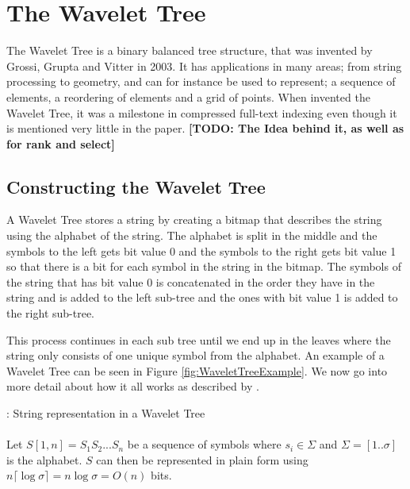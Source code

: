 \section{The Wavelet Tree}
The Wavelet Tree is a binary balanced tree structure, that was invented by Grossi, Grupta and Vitter \citep{Grossi:2003:HET:644108.644250} in 2003. 
It has applications in many areas; from string processing to geometry, and can for instance be used to represent; a sequence of elements, a reordering of elements and a grid of points. 
When \citep{Grossi:2003:HET:644108.644250} invented the Wavelet Tree, it was a milestone in compressed full-text indexing even though it is mentioned very little in the paper.
\textbf{[TODO: The Idea behind it, as well as for rank and select]}

\subsection{Constructing the Wavelet Tree}
A Wavelet Tree stores a string by creating a bitmap that describes the string using the alphabet of the string. The alphabet is split in the middle and the symbols to the left gets bit value 0 and the symbols to the right gets bit value 1 so that there is a bit for each symbol in the string in the bitmap. 
The symbols of the string that has bit value 0 is concatenated in the order they have in the string and is added to the left sub-tree and the ones with bit value 1 is added to the right sub-tree. 

This process continues in each sub tree until we end up in the leaves where the string only consists of one unique symbol from the alphabet. 
An example of a Wavelet Tree can be seen in Figure \ref{fig:WaveletTreeExample}. 
We now go into more detail about how it all works as described by \citep{Navjda13}.

\vspace{0.5 cm}
\begin{mdframed}[nobreak, linecolor=lightgray, linewidth=2pt]
\begin{definition}: String representation in a Wavelet Tree\\\\
Let $S[1,n] = S_1 S_2 ... S_n$ be a sequence of symbols where $s_i \in \Sigma$ and $\Sigma = [1 .. \sigma]$ is the alphabet. $S$ can then be represented in plain form using $n \lceil \log \sigma \rceil = n \log \sigma = O(n)$ bits.
\end{definition}
\end{mdframed}
\vspace{0.5 cm}


